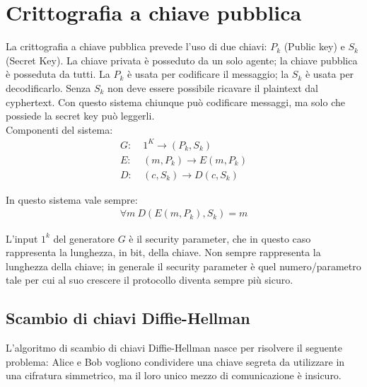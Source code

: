 \setchapterpreamble[u]{\margintoc}
\chapter{Crittografia a chiave pubblica}

La crittografia a chiave pubblica prevede l'uso di due chiavi: $P_k$ (Public key) e $S_k$ (Secret Key). La chiave privata è posseduto da un solo agente; la chiave pubblica è posseduta da tutti. La $P_k$ è usata per codificare il messaggio; la $S_k$ è usata per decodificarlo. Senza $S_k$ non deve essere possibile ricavare il plaintext dal cyphertext. Con questo sistema chiunque può codificare messaggi, ma solo che possiede la secret key può leggerli.\\

\noindent Componenti del sistema:
\begin{align*}
    G: \ &1^K \rightarrow (P_k, S_k)\\
    E: \ &(m, P_k) \rightarrow E(m, P_k)\\
    D: \ &(c, S_k) \rightarrow D(c, S_k)
\end{align*}

\noindent In questo sistema vale sempre:
\begin{align*}
   \forall m \ D(E(m, P_k), S_k) = m
\end{align*}

\noindent L'input $1^k$ del generatore $G$ è il security parameter, che in questo caso rappresenta la lunghezza, in bit, della chiave. Non sempre rappresenta la lunghezza della chiave; in generale il security parameter è quel numero/parametro tale per cui al suo crescere il protocollo diventa sempre più sicuro.

\section{Scambio di chiavi Diffie-Hellman}

L'algoritmo di scambio di chiavi Diffie-Hellman nasce per risolvere il seguente problema: Alice e Bob vogliono condividere una chiave segreta da utilizzare in una cifratura simmetrico, ma il loro unico mezzo di comunicazione è insicuro.


